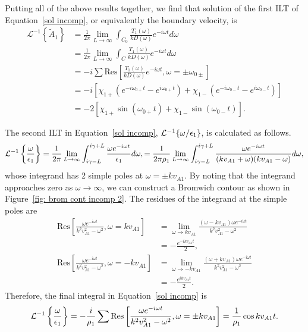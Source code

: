 \documentclass{aastex61}
\begin{document}
Putting all of the above results together, we find that solution of the first ILT of Equation~\eqref{sol incomp}, or equivalently the boundary velocity, is
\begin{align}
\mathcal{L}^{-1}\left\{ \tilde{A}_1 \right\} &= \frac{1}{2\pi} \lim_{L \to \infty} \int_{C_0} \frac{T_1(\omega)}{kD(\omega)} e^{-i\omega t} d\omega \\
&= \frac{1}{2\pi} \lim_{L \to \infty} \int_{C} \frac{T_1(\omega)}{kD(\omega)} e^{-i\omega t} d\omega \\
&= -i \sum \mathrm{Res}\left[\frac{T_1(\omega)}{kD(\omega)}e^{-i\omega t}, \omega = \pm \omega_{0\pm} \right] \\
&= -i [\chi_{1+} (e^{-i\omega_{0+} t} - e^{i\omega_{0+} t}) + \chi_{1-} (e^{-i\omega_{0-} t} - e^{i\omega_{0-} t})] \\
&= -2 [\chi_{1+} \sin(\omega_{0+} t) + \chi_{1-} \sin(\omega_{0-} t)].
\end{align}


The second ILT in Equation~\eqref{sol incomp}, $\mathcal{L}^{-1}\{ \omega / \epsilon_1 \}$, is calculated as follows.
\begin{equation}
\mathcal{L}^{-1}\left\{ \frac{\omega}{\e_1} \right\} = \frac{1}{2\pi}\lim_{L \to \infty} \int_{i\gamma - L}^{i\gamma + L} \frac{\omega e^{-i\omega t}}{\e_1} d\omega,
= \frac{1}{2\pi\rho_1}\lim_{L \to \infty} \int_{i\gamma - L}^{i\gamma + L} \frac{\omega e^{-i\omega t}}{(kv_{A1} + \omega)(kv_{A1} - \omega)} d\omega,
\end{equation}
whose integrand has 2 simple poles at $\omega = \pm k v_{A1}$. By noting that the integrand approaches zero as $\omega \to \infty$, we can construct a Bromwich contour as shown in Figure~\ref{fig: brom cont incomp 2}. The residues of the integrand at the simple poles are
\begin{align}
\mathrm{Res}\left[\frac{\omega e^{-i\omega t}}{k^2v_{A1}^2 - \omega^2}, \omega = kv_{A1} \right] &= 
\lim_{\omega \to kv_{A1}} \frac{(\omega - kv_{A1}) \omega e^{-i\omega t}}{k^2v_{A1}^2 - \omega^2} \\ 
&= -\frac{e^{-ikv_{A1} t}}{2}, \\
\mathrm{Res}\left[\frac{\omega e^{-i\omega t}}{k^2v_{A1}^2 - \omega^2}, \omega = -kv_{A1} \right] &= 
\lim_{\omega \to -kv_{A1}} \frac{(\omega + kv_{A1}) \omega e^{-i\omega t}}{k^2v_{A1}^2 - \omega^2} \\ 
&= -\frac{e^{ikv_{A1} t}}{2}.
\end{align}
Therefore, the final integral in Equation~\eqref{sol incomp} is
\begin{equation}
\mathcal{L}^{-1}\left\{ \frac{\omega}{\e_1} \right\} = -\frac{i}{\rho_1} \sum \mathrm{Res} \left[ \frac{\omega e^{-i\omega t}}{k^2v_{A1}^2 - \omega^2}, \omega = \pm kv_{A1} \right] = \frac{1}{\rho_1}\cos{kv_{A1}t}.
\end{equation}
\end{document}
